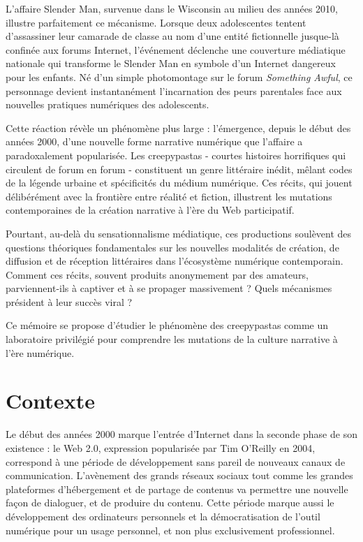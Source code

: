 \documentclass[12pt,a4paper,oneside,titlepage]{book} %
\begin{document}
L'affaire Slender Man, survenue dans le Wisconsin au milieu des années 2010, illustre parfaitement ce mécanisme. Lorsque deux adolescentes tentent d'assassiner leur camarade de classe au nom d'une entité fictionnelle jusque-là confinée aux forums Internet, l'événement déclenche une couverture médiatique nationale qui transforme le Slender Man en symbole d'un Internet dangereux pour les enfants. Né d'un simple photomontage sur le forum \textit{Something Awful}, ce personnage devient instantanément l'incarnation des peurs parentales face aux nouvelles pratiques numériques des adolescents.

Cette réaction révèle un phénomène plus large : l'émergence, depuis le début des années 2000, d'une nouvelle forme narrative numérique que l'affaire a paradoxalement popularisée. Les creepypastas - courtes histoires horrifiques qui circulent de forum en forum - constituent un genre littéraire inédit, mêlant codes de la légende urbaine et spécificités du médium numérique. Ces récits, qui jouent délibérément avec la frontière entre réalité et fiction, illustrent les mutations contemporaines de la création narrative à l'ère du Web participatif.

Pourtant, au-delà du sensationnalisme médiatique, ces productions soulèvent des questions théoriques fondamentales sur les nouvelles modalités de création, de diffusion et de réception littéraires dans l'écosystème numérique contemporain. Comment ces récits, souvent produits anonymement par des amateurs, parviennent-ils à captiver et à se propager massivement ? Quels mécanismes président à leur succès viral ? 


Ce mémoire se propose d'étudier le phénomène des creepypastas comme un laboratoire privilégié pour comprendre les mutations de la culture narrative à l'ère numérique.

\section*{Contexte}

Le début des années 2000 marque l’entrée d’Internet dans la seconde phase de son existence : le Web 2.0, expression popularisée par Tim O'Reilly en 2004, correspond à une période de développement sans pareil de nouveaux canaux de communication. L’avènement des grands réseaux sociaux tout comme les grandes plateformes d’hébergement et de partage de contenus va permettre une nouvelle façon de dialoguer, et de produire du contenu. Cette période marque aussi le développement des ordinateurs personnels et la démocratisation de l'outil numérique pour un usage personnel, et non plus exclusivement professionnel.
\end{document}
